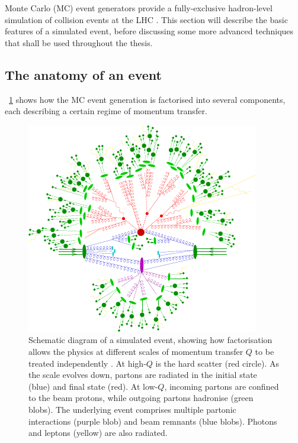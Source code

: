 
Monte Carlo (MC) event generators provide a fully-exclusive hadron-level simulation of 
\pp collision events at the LHC \cite{MCnet:general}. This section will describe the 
basic features of a simulated event, before discussing some more advanced techniques 
that shall be used throughout the thesis.



\subsection{The anatomy of an event}

\Figure~\ref{fig:mcevent} shows how the MC event generation is factorised into 
several components, each describing a certain regime of momentum transfer.

\begin{figure}[p]
	\includegraphics[width=\hugefigwidth]{tex/tools/event}
	\caption{Schematic diagram of a simulated \ttH event, showing how factorisation allows 
	the physics at different scales of momentum transfer $Q$ to be treated independently 
	\cite{MCnet:MatchingLectures}.
	At high-$Q$ is the hard scatter (red circle). As the scale evolves down, partons are 
	radiated in the initial state (blue) and final state (red). At low-$Q$, incoming 
	partons are confined to the beam protons, while outgoing partons hadronise (green 
	blobs). The underlying event comprises multiple partonic interactions (purple blob) 
	and beam remnants (blue blobs). Photons and leptons (yellow) are also radiated.}
	\label{fig:mcevent}
\end{figure}

